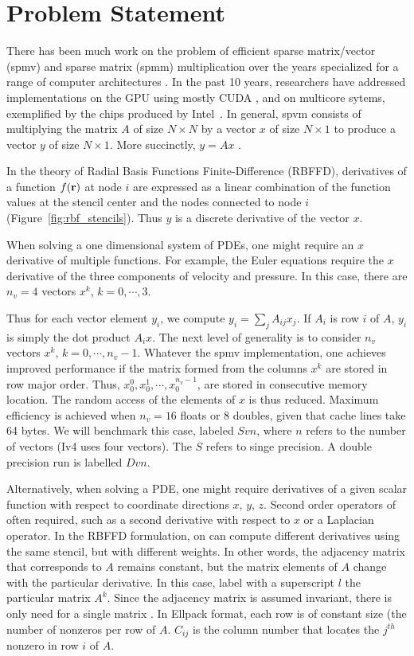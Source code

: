 \section{Problem Statement}
There has been much work on the problem of efficient sparse matrix/vector (spmv) and sparse matrix  (spmm) multiplication over the years \cite{} specialized for a range of computer architectures \cite{}. In the past 10 years, researchers have addressed implementations on the GPU using mostly CUDA \cite{}, and on multicore sytems, exemplified by the chips produced by Intel~\cite{}. In general, spvm consists of multiplying the matrix $A$ of size $N\times N$ by a vector $x$ of size $N\times 1$ to produce a vector $y$ of size $N\times 1$. More succinctly, $ y = A x $ .

In the theory of Radial Basis Functions Finite-Difference (RBFFD), derivatives of a function $f({\bf r})$ at node $i$ are expressed as a linear combination of the function values at the stencil center and the nodes connected to node $i$ (Figure~\ref{fig:rbf_stencils}). Thus $y$ is a discrete derivative of the vector $x$. 


When solving a one dimensional system of PDEs, one might require an $x$ derivative of multiple functions. For example, the Euler equations require the $x$ derivative of the three components of velocity and pressure. In this case, there are $n_v=4$ vectors $x^k$, $k=0,\cdots,3$. 

Thus for each vector element $y_i$, we compute $y_i = \sum_j A_{ij} x_j$. If $A_i$ is row $i$ of $A$, $y_i$ is simply the dot product $A_i x$. The next level of generality is to consider $n_v$ vectors $x^k$, $k=0,\cdots,n_v-1$. Whatever the spmv implementation, one achieves improved performance if the matrix formed from the columns $x^k$ are stored in row major order. Thus, $x^0_0,x^1_0,\cdots,x^{n_v-1}_0$, are stored in consecutive memory location. The random access of the elements of $x$ is thus reduced. Maximum efficiency is achieved when $n_v=16$ floats or $8$ doubles, given that cache lines take 64 bytes. We will benchmark this case, labeled $Svn$, where $n$ refers to the number of vectors (Iv4 uses four vectors). The $S$ refers to singe precision. A double precision run is labelled $Dvn$. 

Alternatively, when solving a PDE, one might require derivatives of a given scalar function with respect to coordinate directions $x$, $y$, $z$. Second order operators of often required, such as a second derivative with respect to $x$ or a Laplacian operator. In the RBFFD formulation, on can compute different derivatives using the same stencil, but with different weights. In other words, the adjacency matrix that corresponds to $A$ remains constant, but the matrix elements of $A$ change with the particular derivative. 
In this case, label with a superscript $l$ the particular matrix $A^k$. Since the adjacency matrix is assumed invariant, there is only need for a single matrix . In Ellpack format, each row is of constant size (the number of nonzeros per row of $A$. $C_{ij}$ is the column number that locates the $j^{th}$ nonzero in row $i$ of $A$.

